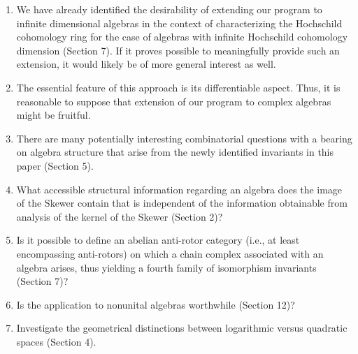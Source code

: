 \documentclass{amsart}
\numberwithin{equation}{section}
\theoremstyle{definition}
\numberwithin{theorem}{section}
\begin{document}
\begin{enumerate}\item We have already identified the desirability of extending our program to \mbox{infinite} dimensional algebras in the context of characterizing the Hochschild cohomology ring for the case of algebras with infinite Hochschild cohomology dimension (Section 7).  If it proves possible to meaningfully provide such an extension, it would likely be of more general interest as well.
\item The essential feature of this approach is its differentiable aspect.  Thus, it is reasonable to suppose that extension of our program to complex algebras might be fruitful. 
\item There are many potentially interesting combinatorial questions with a bearing on algebra structure that arise from the newly identified invariants in this paper (Section 5). 
\item What accessible structural information regarding an algebra does the image of the Skewer contain that is independent of the information obtainable from analysis of the kernel of the Skewer (Section 2)? 
\item Is it possible to define an abelian anti-rotor category  (i.e., at least encompassing anti-rotors) on which a chain complex associated with an algebra arises, thus yielding a fourth family of isomorphism invariants (Section 7)?
\item Is the application to nonunital algebras worthwhile (Section 12)?
\item Investigate the geometrical distinctions between logarithmic versus quadratic spaces (Section 4).
\end{enumerate}

\vspace{1cm}
\end{document}
